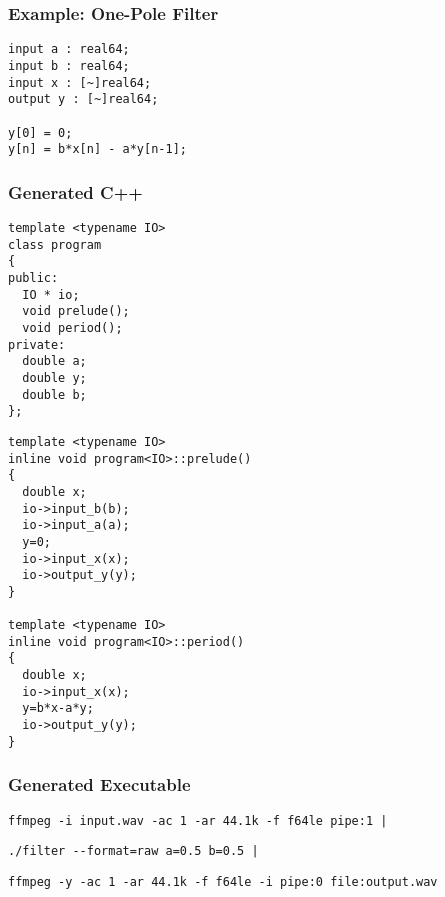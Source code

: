 \documentclass{beamer}
\begin{document}
\begin{frame}[fragile]
\frametitle{Example: One-Pole Filter}

\centering

\begin{BVerbatim}
input a : real64;
input b : real64;
input x : [~]real64;
output y : [~]real64;

y[0] = 0;
y[n] = b*x[n] - a*y[n-1];
\end{BVerbatim}

\end{frame}


\begin{frame}[fragile]
\frametitle{Generated C++}

\footnotesize
\begin{minipage}{0.49\linewidth}
\begin{BVerbatim}
template <typename IO>
class program
{
public:
  IO * io;
  void prelude();
  void period();
private:
  double a;
  double y;
  double b;
};
\end{BVerbatim}
\end{minipage}\hfill
\begin{minipage}{0.49\linewidth}
\begin{BVerbatim}
template <typename IO>
inline void program<IO>::prelude()
{
  double x;
  io->input_b(b);
  io->input_a(a);
  y=0;
  io->input_x(x);
  io->output_y(y);
}

template <typename IO>
inline void program<IO>::period()
{
  double x;
  io->input_x(x);
  y=b*x-a*y;
  io->output_y(y);
}
\end{BVerbatim}
\end{minipage}

\end{frame}


\begin{frame}[fragile]
\frametitle{Generated Executable}

\small

\begin{Verbatim}
ffmpeg -i input.wav -ac 1 -ar 44.1k -f f64le pipe:1 |
\end{Verbatim}

{
\bf
\begin{Verbatim}
./filter --format=raw a=0.5 b=0.5 |
\end{Verbatim}
}

\begin{Verbatim}
ffmpeg -y -ac 1 -ar 44.1k -f f64le -i pipe:0 file:output.wav
\end{Verbatim}

\end{frame}
\end{document}
